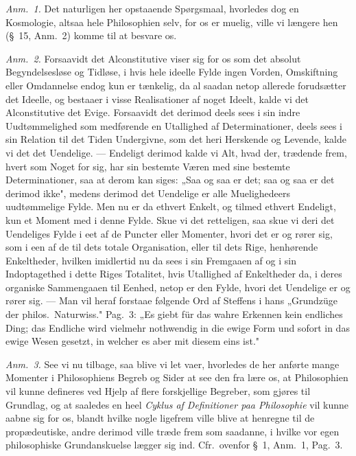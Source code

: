 \documentclass[12pt,a4paper]{book}
\begin{document}
{\small\emph{Anm.~1.} Det naturligen her opstaaende Spørgsmaal, hvorledes dog en
Kosmologie, altsaa hele Philosophien selv, for os er muelig, ville vi længere hen
(\S~15, Anm.~2) komme til at besvare os.\par}

{\small\emph{Anm.~2.} Forsaavidt det Alconstitutive viser sig for os som det absolut
Begyndelsesløse og Tidløse, i hvis hele ideelle Fylde ingen Vorden, Omskiftning
eller Omdannelse endog kun er tænkelig, da al saadan netop allerede forudsætter det
Ideelle, og bestaaer i visse Realisationer af noget Ideelt, kalde vi det
Alconstitutive det Evige. Forsaavidt det derimod deels sees i sin indre
Uudtømmelighed som medførende en Utallighed af Determinationer, deels sees i sin
Relation til det Tiden Undergivne, som det heri Herskende og Levende, kalde vi det
det Uendelige. --- Endeligt derimod kalde vi Alt, hvad der, trædende frem, hvert som
Noget for sig, har sin bestemte Væren med sine bestemte Determinationer, saa at
derom kan siges: „Saa og saa er det; saa og saa er det derimod ikke", medens derimod
det Uendelige er alle Muelighedeers uudtømmelige Fylde. Men nu er da ethvert Enkelt,
og tilmed ethvert Endeligt, kun et Moment med i denne Fylde. Skue vi det retteligen,
saa skue vi deri det Uendeliges Fylde i eet af de Puncter eller Momenter, hvori det
er og rører sig, som i een af de til dets totale Organisation, eller til dets Rige,
henhørende Enkeltheder, hvilken imidlertid nu da sees i sin Fremgaaen af og i sin
Indoptagethed i dette Riges Totalitet, hvis Utallighed af Enkeltheder da, i deres
organiske Sammengaaen til Eenhed, netop er den Fylde, hvori det Uendelige er og
rører sig. --- Man vil heraf forstaae følgende Ord af Steffens i hans „Grundzüge der
philos.\ Naturwiss." Pag.\ 3: „Es giebt für das wahre Erkennen kein endliches Ding;
das Endliche wird vielmehr nothwendig in die ewige Form und sofort in das ewige
Wesen gesetzt, in welcher es aber mit diesem eins ist."\par}

{\small\emph{Anm.~3.} See vi nu tilbage, saa blive vi let vaer, hvorledes de her
anførte mange Momenter i Philosophiens Begreb og Sider at see den fra lære os, at
Philosophien vil kunne defineres ved Hjelp af flere forskjellige Begreber, som
gjøres til Grundlag, og at saaledes en heel \emph{Cyklus af Definitioner paa
Philosophie} vil kunne aabne sig for os, blandt hvilke nogle ligefrem ville blive at
henregne til de propædeutiske, andre derimod ville træde frem som saadanne, i hvilke
vor egen philosophiske Grundanskuelse lægger sig ind. Cfr.\ ovenfor \S~1, Anm.~1,
Pag.\ 3.\par}
\end{document}
